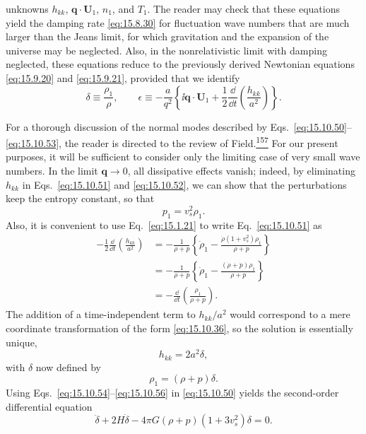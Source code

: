 unknowns \(h_{kk}\), \(\mathbf q\cdot\mathbf U_1\), \(n_1\), and \(T_1\).
The reader may check that these equations yield the damping rate
\eqref{eq:15.8.30} for fluctuation wave numbers that are much larger than the
Jeans limit, for which gravitation and the expansion of the universe may be
neglected. Also, in the nonrelativistic limit with damping neglected, these
equations reduce to the previously derived Newtonian equations
\eqref{eq:15.9.20} and \eqref{eq:15.9.21}, provided that we identify
\[
  \delta\equiv\frac{\rho_1}{\rho},
  \qquad
  \epsilon
  \equiv
  -\frac a{q^2}
  \left\{
    \ii\mathbf q\cdot\mathbf U_1
    +\frac12\frac{\dd}{\dd t}\left(\frac{h_{kk}}{a^2}\right)
  \right\}.
\]

For a thorough discussion of the normal modes described by
Eqs.~\eqref{eq:15.10.50}--\eqref{eq:15.10.53}, the reader is directed to
the review of Field.\hyperref[ch15-ref-157]{\textsuperscript{157}} For our
present purposes, it will be sufficient to consider only the limiting case of
very small wave numbers. In the limit \(\mathbf q\to0\), all dissipative
effects vanish; indeed, by eliminating \(h_{kk}\) in
Eqs.~\eqref{eq:15.10.51} and \eqref{eq:15.10.52}, we can show that the
perturbations keep the entropy constant, so that
\begin{equation}
  p_1=v_s^2\rho_1.
  \tag{15.10.54}\label{eq:15.10.54}
\end{equation}
Also, it is convenient to use Eq.~\eqref{eq:15.1.21} to write
Eq.~\eqref{eq:15.10.51} as
\[
  \begin{aligned}
  -\frac12\frac{\dd}{\dd t}\left(\frac{h_{kk}}{a^2}\right)
  &=
  -\frac1{\rho+p}
  \left\{
    \dot\rho_1
    -\frac{\dot\rho(1+v_s^2)\rho_1}{\rho+p}
  \right\}\\
  &=
  -\frac1{\rho+p}
  \left\{
    \dot\rho_1
    -\frac{(\dot\rho+\dot p)\rho_1}{\rho+p}
  \right\}\\
  &=
  -\frac{\dd}{\dd t}\left(\frac{\rho_1}{\rho+p}\right).
  \end{aligned}
\]
The addition of a time-independent term to \(h_{kk}/a^2\) would correspond
to a mere coordinate transformation of the form \eqref{eq:15.10.36}, so the
solution is essentially unique,
\begin{equation}
  h_{kk}=2a^2\delta,
  \tag{15.10.55}\label{eq:15.10.55}
\end{equation}
with \(\delta\) now defined by
\begin{equation}
  \rho_1=(\rho+p)\delta.
  \tag{15.10.56}\label{eq:15.10.56}
\end{equation}
Using Eqs.~\eqref{eq:15.10.54}--\eqref{eq:15.10.56} in
\eqref{eq:15.10.50} yields the second-order differential equation
\begin{equation}
  \ddot\delta
  +2H\dot\delta
  -4\pi G(\rho+p)(1+3v_s^2)\delta
  =0.
  \tag{15.10.57}\label{eq:15.10.57}
\end{equation}

